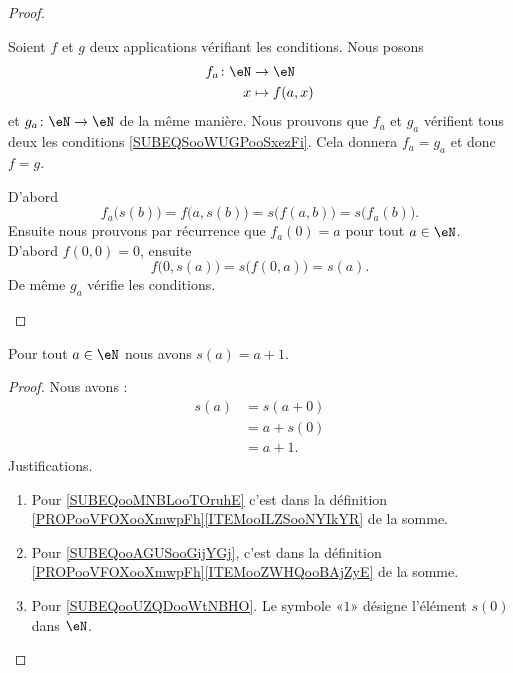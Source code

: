 \begin{proof}
\begin{subproof}
		\spitem[Unicité]
		Soient \( f\) et \( g\) deux applications vérifiant les conditions. Nous posons
		\begin{equation}
			\begin{aligned}
				f_a\colon \eN & \to \eN        \\
				x             & \mapsto f(a,x)
			\end{aligned}
		\end{equation}
		et \(g_a \colon \eN\to \eN  \) de la même manière. Nous prouvons que \( f_a\) et \( g_a\) vérifient tous deux les conditions \eqref{SUBEQSooWUGPooSxezFi}. Cela donnera \( f_a=g_a\) et donc \( f=g\).

		D'abord
		\begin{equation}
			f_a\big( s(b) \big)=f\big( a,s(b) \big)=s\big( f(a,b) \big)=s\big( f_a(b) \big).
		\end{equation}
		Ensuite nous prouvons par récurrence que \( f_a(0)=a\) pour tout \( a\in \eN\). D'abord \( f(0,0)=0\), ensuite
		\begin{equation}
			f\big( 0,s(a) \big)=s\big( f(0,a) \big)=s(a).
		\end{equation}
		De même \( g_a\) vérifie les conditions.
	\end{subproof}
\end{proof}

\begin{lemma}      \label{LEMooMJMTooOtUuJT}
	Pour tout \( a\in \eN\) nous avons \( s(a)=a+1\).
\end{lemma}

\begin{proof}
	Nous avons :
	\begin{subequations}
		\begin{align}
			s(a) & =s(a+0)        \label{SUBEQooMNBLooTOruhE} \\
			     & =a+s(0)        \label{SUBEQooAGUSooGijYGj} \\
			     & =a+1.          \label{SUBEQooUZQDooWtNBHO}
		\end{align}
	\end{subequations}
	Justifications.
	\begin{enumerate}
		\item
		      Pour \eqref{SUBEQooMNBLooTOruhE} c'est dans la définition \ref{PROPooVFOXooXmwpFh}\ref{ITEMooILZSooNYIkYR} de la somme.
		\item
		      Pour \eqref{SUBEQooAGUSooGijYGj}, c'est dans la définition \ref{PROPooVFOXooXmwpFh}\ref{ITEMooZWHQooBAjZyE} de la somme.
		\item
		      Pour \eqref{SUBEQooUZQDooWtNBHO}. Le symbole «\( 1\)» désigne l'élément \( s(0)\) dans \( \eN\).
	\end{enumerate}
\end{proof}

